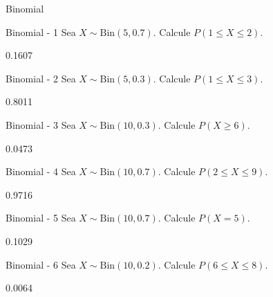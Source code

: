\documentclass[a4,11pt]{aleph-notas}
\newcommand{\Bin}{\text{Bin}}
\begin{document}
\begin{quiz}{Binomial}

\begin{numerical}[tolerance=0.01]%
    {Binomial - 1}
    Sea \( X \sim \Bin(5,0.7) \). Calcule \( P(1 \leq X \leq 2) \).
    \item[] 0.1607
\end{numerical}

\begin{numerical}[tolerance=0.01]%
    {Binomial - 2}
    Sea \( X \sim \Bin(5,0.3) \). Calcule \( P(1 \leq X \leq 3) \).
    \item[] 0.8011
\end{numerical}

\begin{numerical}[tolerance=0.01]%
    {Binomial - 3}
    Sea \( X \sim \Bin(10,0.3) \). Calcule \( P(X \geq 6) \).
    \item[] 0.0473
\end{numerical}

\begin{numerical}[tolerance=0.01]%
    {Binomial - 4}
    Sea \( X \sim \Bin(10,0.7) \). Calcule \( P(2 \leq X \leq 9) \).
    \item[] 0.9716
\end{numerical}

\begin{numerical}[tolerance=0.01]%
    {Binomial - 5}
    Sea \( X \sim \Bin(10,0.7) \). Calcule \( P(X = 5) \).
    \item[] 0.1029
\end{numerical}

\begin{numerical}[tolerance=0.01]%
    {Binomial - 6}
    Sea \( X \sim \Bin(10,0.2) \). Calcule \( P(6 \leq X \leq 8) \).
    \item[] 0.0064
\end{numerical}


\end{quiz}
\end{document}
